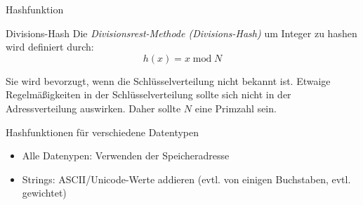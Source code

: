 \begin{defi}{Hashfunktion}
\begin{center}
    \end{center}
\end{defi}

\begin{example}{Divisions-Hash}
    Die \emph{Divisionsrest-Methode (Divisions-Hash)} um Integer zu hashen wird definiert durch:
    $$
        h(x) = x \operatorname{mod} N
    $$

    Sie wird bevorzugt, wenn die Schlüsselverteilung nicht bekannt ist.
    Etwaige Regelmäßigkeiten in der Schlüsselverteilung sollte sich nicht in der Adressverteilung auswirken. Daher sollte $N$ eine Primzahl sein.
\end{example}

\begin{example}{Hashfunktionen für verschiedene Datentypen}
    \begin{itemize}
        \item Alle Datenypen: Verwenden der Speicheradresse
        \item Strings: ASCII/Unicode-Werte addieren (evtl. von einigen Buchstaben, evtl. gewichtet)
    \end{itemize}
\end{example}

